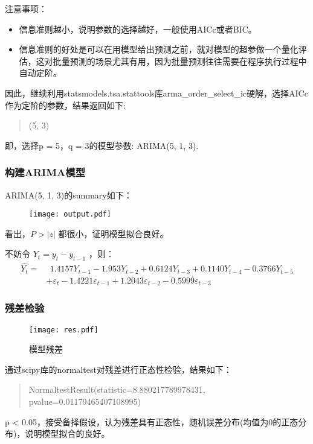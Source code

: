 \documentclass[a4paper,AutoFakeBold,AutoFakeSlant]{ctexart}
\begin{document}
注意事项： 
\begin{itemize}
  \item 信息准则越小，说明参数的选择越好，一般使用AICc或者BIC。
  \item 信息准则的好处是可以在用模型给出预测之前，就对模型的超参做一个量化评估，这对批量预测的场景尤其有用，因为批量预测往往需要在程序执行过程中自动定阶。
\end{itemize}

因此，继续利用statsmodels.tsa.stattools库arma\_order\_select\_ic硬解，选择AICc作为定阶的参数，结果返回如下:
\begin{quotation}
  (5, 3)
\end{quotation}
即，选择p = 5，q = 3的模型参数: ARIMA(5, 1, 3).


\subsubsection{构建ARIMA模型}

ARIMA(5, 1, 3)的summary如下：
\begin{figure}[H]
  \centering
  \texttt{[image: output.pdf]}
\end{figure}

看出，$P>|z|$ 都很小，证明模型拟合良好。

不妨令 $Y_t = y_t - y_{t-1}$ ，则：
\begin{equation}
  \begin{aligned}
    \hat{Y_t} =  &\ \ 1.4157 Y_{t-1} - 1.953 Y_{t-2} + 0.6124Y_{t-3} + 0.1140Y_{t-4} - 0.3766 Y_{t-5}  \\
                &+ \varepsilon_t - 1.4221\varepsilon_{t-1} + 1.2043\varepsilon_{t-2} - 0.5999\varepsilon_{t-3}
  \end{aligned}
\end{equation}

\subsubsection{残差检验}

\begin{figure}[H]
  \centering
  \texttt{[image: res.pdf]}
  \caption{模型残差}
  \label{f11}
\end{figure}
通过scipy库的normaltest对残差进行正态性检验，结果如下：
\begin{quotation}
  NormaltestResult(statistic=8.880217789978431, pvalue=0.01179465407108995)
\end{quotation}
p < 0.05，接受备择假设，认为残差具有正态性，随机误差分布(均值为0的正态分布)，说明模型拟合的良好。
\end{document}
